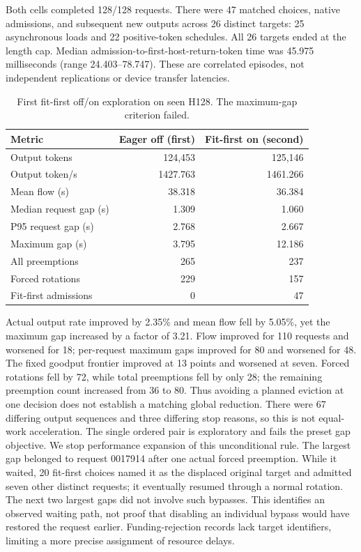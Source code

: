 \documentclass[10pt]{article}
\begin{document}
Both cells completed 128/128 requests. There were 47 matched choices, native admissions, and subsequent new outputs across 26 distinct targets: 25 asynchronous loads and 22 positive-token schedules. All 26 targets ended at the length cap. Median admission-to-first-host-return-token time was 45.975 milliseconds (range 24.403--78.747). These are correlated episodes, not independent replications or device transfer latencies.

\begin{table}[t]
\centering\small
\caption{First fit-first off/on exploration on seen H128. The maximum-gap criterion failed.}
\label{tab:fitfirst}
\begin{tabular}{lrr}
\toprule
Metric & Eager off (first) & Fit-first on (second) \\
\midrule
Output tokens & 124,453 & 125,146 \\
Output token/s & 1427.763 & 1461.266 \\
Mean flow (s) & 38.318 & 36.384 \\
Median request gap (s) & 1.309 & 1.060 \\
P95 request gap (s) & 2.768 & 2.667 \\
Maximum gap (s) & 3.795 & 12.186 \\
All preemptions & 265 & 237 \\
Forced rotations & 229 & 157 \\
Fit-first admissions & 0 & 47 \\
\bottomrule
\end{tabular}
\end{table}

Actual output rate improved by 2.35\% and mean flow fell by 5.05\%, yet the maximum gap increased by a factor of 3.21. Flow improved for 110 requests and worsened for 18; per-request maximum gaps improved for 80 and worsened for 48. The fixed goodput frontier improved at 13 points and worsened at seven. Forced rotations fell by 72, while total preemptions fell by only 28; the remaining preemption count increased from 36 to 80. Thus avoiding a planned eviction at one decision does not establish a matching global reduction. There were 67 differing output sequences and three differing stop reasons, so this is not equal-work acceleration. The single ordered pair is exploratory and fails the preset gap objective. We stop performance expansion of this unconditional rule. The largest gap belonged to request 0017914 after one actual forced preemption. While it waited, 20 fit-first choices named it as the displaced original target and admitted seven other distinct requests; it eventually resumed through a normal rotation. The next two largest gaps did not involve such bypasses. This identifies an observed waiting path, not proof that disabling an individual bypass would have restored the request earlier. Funding-rejection records lack target identifiers, limiting a more precise assignment of resource delays.
\end{document}
